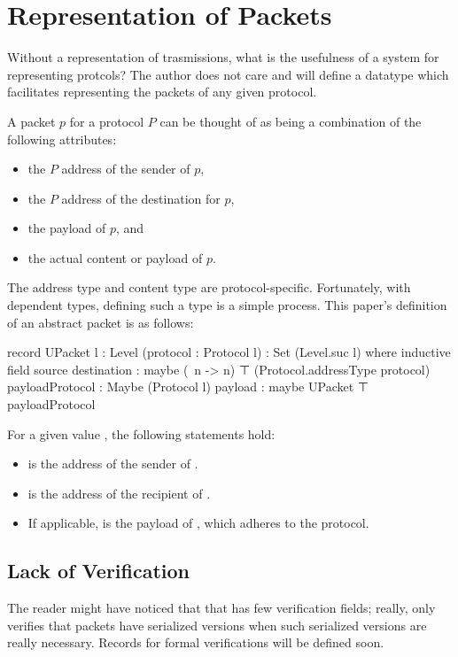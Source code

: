 \documentclass{report}
\begin{document}
\chapter{Representation of Packets}
Without a representation of trasmissions, what is the usefulness of a system for representing protcols?  The author does not care and will define a datatype which facilitates representing the packets of any given protocol.

A packet \(p\) for a protocol \(P\) can be thought of as being a combination of the following attributes:
\begin{itemize}
  \item the \(P\) address of the sender of \(p\),
  \item the \(P\) address of the destination for \(p\),
  \item the payload of \(p\), and
  \item the actual content or payload of \(p\).
\end{itemize}

The address type and content type are protocol-specific.  Fortunately, with dependent types, defining such a type is a simple process.  This paper's definition of an abstract packet is as follows:

\begin{code}
    record UPacket {l : Level} (protocol : Protocol l) : Set (Level.suc l) where
      inductive
      field
        source
         destination : maybe (\ n -> n) ⊤ (Protocol.addressType protocol)
        payloadProtocol : Maybe (Protocol l)
        payload : maybe UPacket ⊤ payloadProtocol
\end{code}

For a given   value , the following statements hold:
\begin{itemize}
  \item {}  is the address of the sender of .
  \item {}  is the address of the recipient of .
  \item If applicable,   is the payload of , which adheres to the   protocol.
\end{itemize}

\section{Lack of Verification}
The reader might have noticed that that  has few verification fields; really,  only verifies that packets have serialized versions when such serialized versions are really necessary.  Records for formal verifications will be defined soon.
\end{document}
